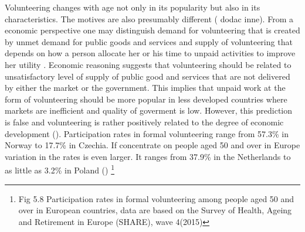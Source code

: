 \documentclass[10pt, letterpaper]{article}
\newcommand{\emd}[1]{\ExecuteMetaData[/tmp/tex]{#1}} %
\begin{document}
\begin{spacing}{1.4} %






Volunteering changes with age not only in its popularity but also in its characteristics. The motives are also presumably different (\citet{wilson12} dodac inne).  From a  economic perspective one may distinguish demand for volunteering that is created by unmet demand for public goods and services and supply of volunteering that depends on how  a person allocate her or his time to unpaid activities to improve her utility \citet{ziemek06}. Economic reasoning  suggests that volunteering should be related to unsatisfactory level of supply of public good and services  that are not delivered by either the market or the government. This implies that unpaid work at the form of volunteering should be more popular in less developed countries where markets are inefficient and quality of goverment is low. However, this prediction is false and volunteering is rather positively  related to the degree of economic development (\citet{Oecd15}). Participation rates in formal volunteering range from 57.3\% in Norway to 17.7\% in Czechia. If concentrate on people aged 50 and over in Europe variation in the rates is even larger. It ranges from 37.9\% in the Netherlands to as little as 3.2\% in Poland (\citet{Oecd15}) \footnote{Fig 5.8 Participation rates in formal volunteering among people aged 50 and over in European countries, data are based on the Survey of Health, Ageing and Retirement in Europe (SHARE), wave 4(2015)} \\ 


\end{spacing}
\end{document}
